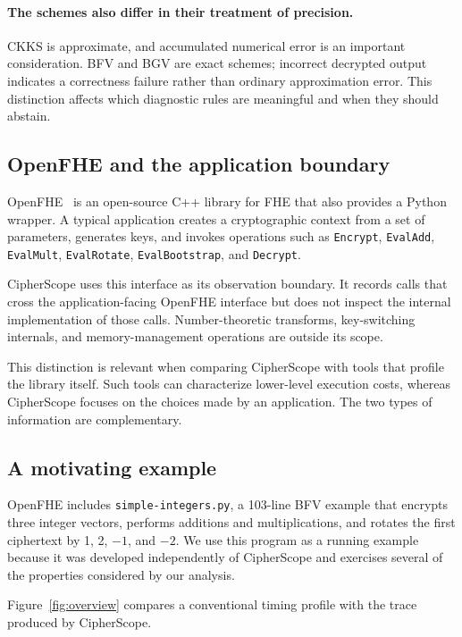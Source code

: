 \documentclass[pdflatex,sn-basic,Numbered,iicol]{sn-jnl}
\begin{document}
\paragraph{The schemes also differ in their treatment of precision.} CKKS is
approximate, and accumulated numerical error is an important consideration.
BFV and BGV are exact schemes; incorrect decrypted output indicates a
correctness failure rather than ordinary approximation error. This
distinction affects which diagnostic rules are meaningful and when they
should abstain.

\subsection{OpenFHE and the application boundary}

OpenFHE~\cite{openfhe2022} is an open-source C++ library for FHE that also
provides a Python wrapper. A typical application creates a cryptographic
context from a set of parameters, generates keys, and invokes operations such
as \texttt{Encrypt}, \texttt{EvalAdd}, \texttt{EvalMult},
\texttt{EvalRotate}, \texttt{EvalBootstrap}, and \texttt{Decrypt}.

CipherScope uses this interface as its observation boundary. It records calls
that cross the application-facing OpenFHE interface but does not inspect the
internal implementation of those calls. Number-theoretic transforms,
key-switching internals, and memory-management operations are outside its
scope.

This distinction is relevant when comparing CipherScope with tools that
profile the library itself. Such tools can characterize lower-level execution
costs, whereas CipherScope focuses on the choices made by an application. The
two types of information are complementary.

\subsection{A motivating example}
\label{sec:example}

OpenFHE includes \texttt{simple-integers.py}, a 103-line BFV example that
encrypts three integer vectors, performs additions and multiplications, and
rotates the first ciphertext by 1, 2, $-1$, and $-2$. We use this program as
a running example because it was developed independently of CipherScope and
exercises several of the properties considered by our analysis.

Figure~\ref{fig:overview} compares a conventional timing profile with the
trace produced by CipherScope.
\end{document}
